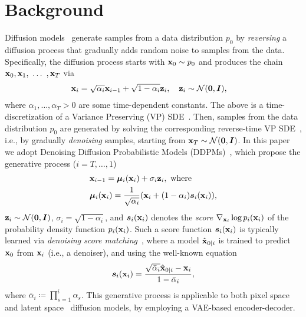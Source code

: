\section{Background }
Diffusion models~\citep{sohl2015deep,ho2020denoising,song2020score} generate samples from a data distribution $p_{0}$ by \emph{reversing} a diffusion process that gradually adds random noise to samples from the data.
Specifically, the diffusion process starts with ${\mathbf{x}}_{0}\sim p_{0}$ and produces the chain ${\mathbf{x}}_{0},{\mathbf{x}}_{1},~\hdots~,{\mathbf{x}}_{T}$
via
\begin{align}
&{\mathbf{x}}_{i}=\sqrt{\alpha_{i}}{\mathbf{x}}_{i-1}+\sqrt{1-\alpha_{i}}{\mathbf{z}}_{i},\quad{\mathbf{z}}_{i}\sim\mathcal{N}({\bm{0}},{\bm{I}}),\label{eq:forward_gaussian_diffusion}
\end{align}
where $\alpha_{1},\hdots,\alpha_{T}>0$ are some time-dependent constants.
The above is a time-discretization of a Variance Preserving (VP) SDE~\citep{song2020score}.
Then, samples from the data distribution $p_{0}$ are generated by solving the corresponding reverse-time VP SDE~\citep{ANDERSON1982313,song2020score}, i.e., by gradually \emph{denoising} samples, starting from ${\mathbf{x}}_{T}\sim\mathcal{N}({\bm{0}},{\bm{I}})$.
In this paper we adopt Denoising Diffusion Probabilistic Models (DDPMs)~\citep{ho2020denoising}, which propose the generative process ($i=T,\ldots,1$)
\begin{align}
    &{\mathbf{x}}_{i-1}={\bm{\mu}}_{i}({\mathbf{x}}_{i})+\sigma_{i}{\mathbf{z}}_{i},~\mbox{where}\label{eq:ddpm}\\
    &{\bm{\mu}}_{i}({\mathbf{x}}_{i})=\frac{1}{\sqrt{\alpha_{i}}}({\mathbf{x}}_{i}+(1-\alpha_{i}){\bm{s}}_{i}({\mathbf{x}}_{i})),
\end{align}
${\mathbf{z}}_{i}\sim\mathcal{N}({\bm{0}},{\bm{I}})$, $\sigma_{i}=\sqrt{1-\alpha_{i}}$, and ${\bm{s}}_{i}({\mathbf{x}}_{i})$ denotes the \emph{score} $\nabla_{{\mathbf{x}}_{i}}\log{p_{i}({\mathbf{x}}_{i})}$ of the probability density function $p_{i}({\mathbf{x}}_{i})$.
Such a score function ${\bm{s}}_{i}({\mathbf{x}}_{i})$ is typically learned via \emph{denoising score matching}~\citep{dsm,NEURIPS2019_3001ef25,song2020score,ho2020denoising}, where a model $\hat{{\mathbf{x}}}_{0|i}$ is trained to predict ${\mathbf{x}}_{0}$ from ${\mathbf{x}}_{i}$ (i.e., a denoiser), and using the well-known equation~\citep{robbins1956empirical,miyasawa1961empirical, stein1981estimation}
\begin{align}\label{eq:x0eq}
{\bm{s}}_{i}({\mathbf{x}}_{i})=\frac{\sqrt{\bar{\alpha}_{i}}\hat{{\mathbf{x}}}_{0|i}-{\mathbf{x}}_{i}}{1-\bar{\alpha}_{i}},
\end{align}
where $\bar{\alpha}_{i}\coloneqq\prod_{s=1}^{i}\alpha_{s}$.
This generative process is applicable to both pixel space~\citep{dhariwal2021diffusion} and latent space~\citep{rombach2022high} diffusion models, by employing a VAE-based encoder-decoder.

